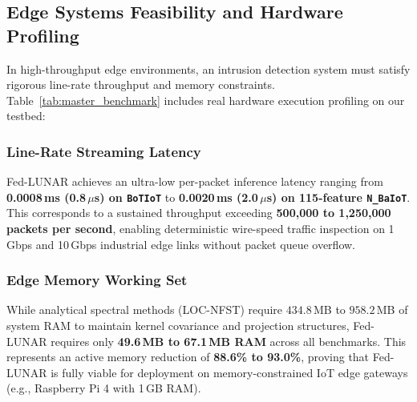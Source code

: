 \subsection{Edge Systems Feasibility and Hardware Profiling}
\label{subsec:hardware_profiling}

In high-throughput edge environments, an intrusion detection system must satisfy rigorous line-rate throughput and memory constraints. Table~\ref{tab:master_benchmark} includes real hardware execution profiling on our testbed:

\subsubsection{Line-Rate Streaming Latency}
Fed-LUNAR achieves an ultra-low per-packet inference latency ranging from \textbf{0.0008\,ms (0.8\,$\mu$s) on \texttt{BoTIoT}} to \textbf{0.0020\,ms (2.0\,$\mu$s) on 115-feature \texttt{N\_BaIoT}}. This corresponds to a sustained throughput exceeding \textbf{500,000 to 1,250,000 packets per second}, enabling deterministic wire-speed traffic inspection on 1\,Gbps and 10\,Gbps industrial edge links without packet queue overflow.

\subsubsection{Edge Memory Working Set}
While analytical spectral methods (LOC-NFST) require $434.8$\,MB to $958.2$\,MB of system RAM to maintain kernel covariance and projection structures, Fed-LUNAR requires only \textbf{49.6\,MB to 67.1\,MB RAM} across all benchmarks. This represents an active memory reduction of \textbf{88.6\% to 93.0\%}, proving that Fed-LUNAR is fully viable for deployment on memory-constrained IoT edge gateways (e.g., Raspberry Pi 4 with 1\,GB RAM).
